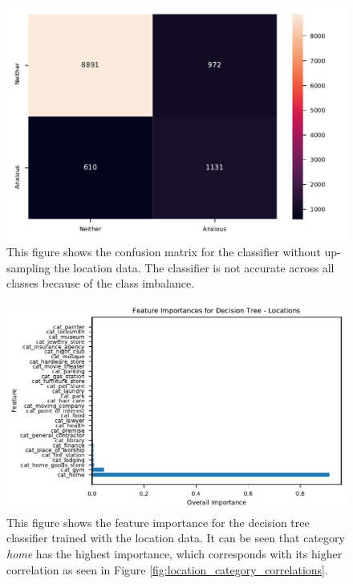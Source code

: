\documentclass{l4proj}
\begin{document}
\begin{figure}[htb]
    \centering
    \includegraphics[width=0.75\linewidth]{images/location/heatmap_Decision_Tree_Locations.pdf}
    \caption{This figure shows the confusion matrix for the classifier without up-sampling the location data. The classifier is not accurate across all classes because of the class imbalance.}
    \label{fig:location_no_upsampling_matrix} 
\end{figure}

\begin{figure}[htb]
    \centering
    \includegraphics[width=0.95\linewidth]{images/location/feature_importance_DecisionTreeLocations.pdf}
    \caption{This figure shows the feature importance for the decision tree classifier trained with the location data. It can be seen that category \textit{home} has the highest importance, which corresponds with its higher correlation as seen in Figure \ref{fig:location_category_correlations}.}
    \label{fig:location_no_upsampling_importance} 
\end{figure}
\end{document}
